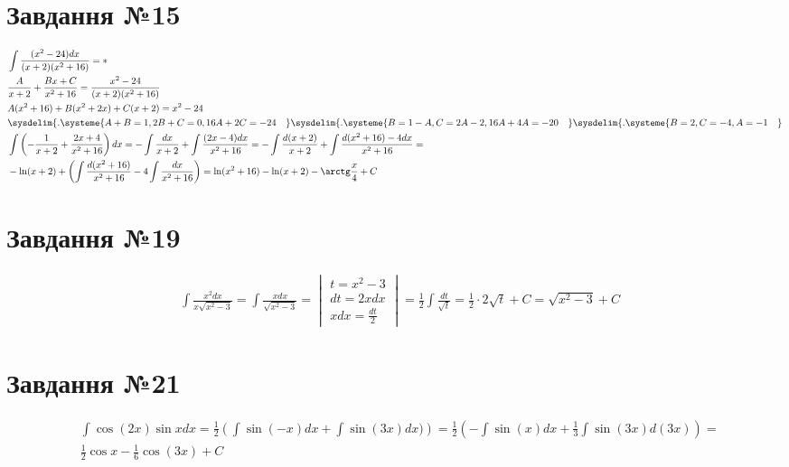 \documentclass{report}
\begin{document}
\section{Завдання №15}
\begin{equation}\begin{split}
	&\int\frac{(x^2 - 24)dx}{(x+2)(x^2 + 16)} = \ast \\
	& \frac{A}{x+2} + \frac{Bx + C}{x^2 + 16} = \frac{x^2 - 24}{(x+2)(x^2 + 16)}\\
	& A(x^2 + 16) + B(x^2 + 2x) + C(x + 2) = x^2 - 24\\
	& \sysdelim\{.\systeme{A + B = 1, 2B + C = 0, 16A + 2C = -24\quad} \sysdelim\{.\systeme{B = 1 - A, C = 2A - 2, 16A + 4A = -20\quad} \sysdelim\{.\systeme{B = 2, C = -4, A = -1\quad}\\
	& \int\left(-\frac{1}{x + 2} + \frac{2x + 4}{x^2 + 16}\right)dx = -\int\frac{dx}{x + 2} + \int\frac{(2x - 4)dx}{x^2 + 16} = -\int\frac{d(x + 2)}{x + 2} + \int\frac{d(x^2 + 16) - 4dx}{x^2 + 16} =\\
	& -\ln(x+2) + \left(\int\frac{d(x^2 + 16)}{x^2 + 16} - 4\int\frac{dx}{x^2 + 16}\right) = \ln(x^2 + 16) - \ln(x+2) - \arctg\frac{x}{4} + C
\end{split}\end{equation}

\section{Завдання №19}
\begin{equation}\begin{split}
	& \int \frac{x^2 dx}{x\sqrt{x^2 - 3}} = \int \frac{xdx}{\sqrt{x^2 - 3}} = \begin{vmatrix}t = x^2 - 3\\dt = 2xdx\\xdx = \frac{dt}{2}\end{vmatrix} = \frac{1}{2}\int\frac{dt}{\sqrt{t}} = \frac{1}{2}\cdot2\sqrt{t} + C = \sqrt{x^2 - 3} + C
\end{split}\end{equation}

\section{Завдання №21}
\begin{equation}\begin{split}
	& \int \cos(2x)\sin x dx=\frac{1}{2} \left(\int \sin(-x)dx + \int\sin(3x)dx)\right) = \frac{1}{2}\left(-\int\sin(x)dx + \frac{1}{3}\int\sin(3x)d(3x)\right) =\\
	& \frac{1}{2}\cos x - \frac{1}{6} \cos(3x) + C
\end{split}\end{equation}
\end{document}
